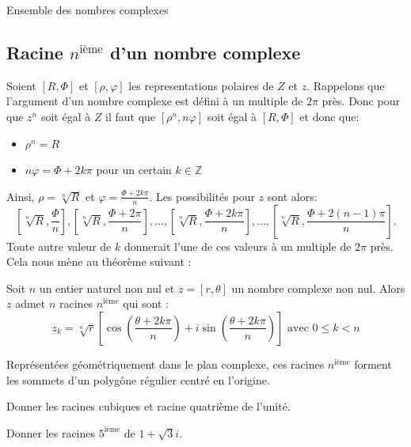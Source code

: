 \begin{chapter}{Ensemble des nombres complexes}
\subsection{Racine $n^{\text{i\`eme}}$ d'un nombre complexe}
%
Soient $[R,\Phi]$ et $[\rho,\varphi]$ les representations polaires de $Z$ et $z$.
Rappelons que l'argument d'un nombre complexe est d\'efini \`a un multiple de $2 \pi$ pr\`es.
Donc pour que $z^n$ soit \'egal \`a $Z$ il faut que $ [\rho^n,n \varphi] $ soit \'egal \`a $[R,\Phi]$ et donc que:
\begin{itemize}
\item $\rho^n = R$
\item $n \varphi = \Phi + 2k \pi $ pour un certain $k \in \mathbb{Z}$
\end{itemize}
Ainsi, $\rho = \sqrt[n]{R}$ et $\varphi = \frac{\Phi + 2 k \pi}{n}$.
Les possibilit\'es pour $z$ sont alors:
\[
      \left[ \sqrt[n]{R} , \frac{\Phi}{n} \right],
      \left[ \sqrt[n]{R} , \frac{\Phi + 2 \pi}{n} \right],
      \dots,
      \left[ \sqrt[n]{R} , \frac{\Phi + 2 k \pi}{n} \right],
      \dots,
      \left[ \sqrt[n]{R} , \frac{\Phi + 2(n-1) \pi}{n} \right].
      \]
Toute autre valeur de $k$ donnerait l'une de ces valeurs \`a un multiple de $2 \pi$ pr\`es.
Cela nous m\`ene au th\'eor\`eme suivant : 
\begin{thm}
Soit $n$ un entier naturel non nul et $z = [r,\theta]$ un nombre complexe non nul.
Alors $z$ admet $n$ racines $n^{\text{i\`eme}}$ qui sont :
$$
z_k = \sqrt[n]{r} \left[ \cos \left( \frac{\theta + 2k \pi}{n} \right) + i \sin \left( \frac{\theta + 2k \pi}{n} \right) \right] \text{ avec } 0 \leq k < n
$$
\end{thm}
%
\begin{rmk}
Repr\'esent\'ees g\'eom\'etriquement dans le plan complexe, ces racines $n^{\text{i\`eme}}$ forment les sommets d'un polyg\^one r\'egulier centr\'e en l'origine.
\end{rmk}
%
\begin{exe}
\label{exe:racines de l'unite}
%
%
Donner les racines cubiques et racine quatri\`eme de l'unit\'e.

\end{exe}
%
\begin{exe}
\label{exe:racine nieme}
Donner les racines $5^{\text{i\`eme}}$ de $1+ \sqrt{3} i$. \\
\end{exe}
%

\end{chapter}
